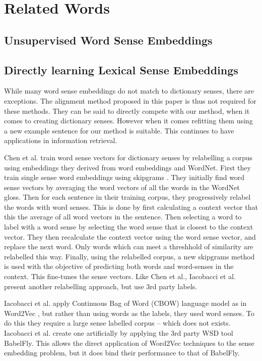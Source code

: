 \documentclass{sig-alternate}
\begin{document}
\section{Related Words}

\subsection{Unsupervised Word Sense Embeddings}



\subsection{Directly learning Lexical Sense Embeddings}
While many word sense embeddings do not match to dictionary senses, there are exceptions.
The alignment method proposed in this paper is thus not required for these methods.
They can be said to directly compete with our method, when it comes to creating dictionary senses. However when it comes refitting them using a new example sentence for our method is suitable. This continues to have applications in information retrieval.


Chen et al. \parencite{Chen2014} train word sense vectors for dictionary senses by relabelling a corpus using embeddings they derived from word embeddings and WordNet. First they train single sense word embeddings using skipgrams \parencite{mikolov2013efficient}. They initially find word sense vectors by averaging the word vectors of all the words in the WordNet gloss.
Then for each sentence in their training corpus, they progressively relabel the words with word senses. This is done by first calculating a context vector that this the average of all word vectors in the sentence. Then selecting a word to label with a word sense by selecting the word sense that is closest to the context vector. They then recalculate the context vector using the word sense vector, and replace the next word. Only words which can meet a threshhold of similarity are relabelled this way.  Finally, using the relabelled corpus, a new skipgrams method is used with the objective of predicting both words and word-senses in the context. This fine-tunes the sense vectors.  Like Chen et al., Iacobacci et al. \parencite{iacobacci2015sensembed} present another relabelling approach, but use 3rd party labels.


Iacobacci et al. \parencite{iacobacci2015sensembed} apply Continuous Bag of Word (CBOW) language model as in Word2Vec , but rather than using words as the labels, they used word senses. To do this they require a large sense labelled corpus -- which does not exists. Iacobacci et al. create one artificially by applying the 3rd party WSD tool BabelFly. This allows the direct application of Word2Vec techniques to the sense embedding problem, but it does bind their performance to that of BabelFly. 
\end{document}
